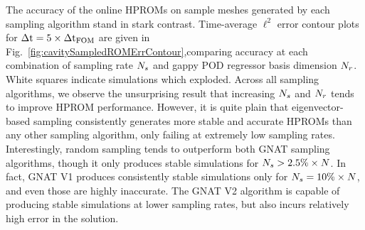 The accuracy of the online HPROMs on sample meshes generated by each sampling algorithm stand in stark contrast. Time-average $\ell^2$ error contour plots for $\Delta \text{t} = 5 \times \Delta \text{t}_{\text{FOM}}$ are given in Fig.~\ref{fig:cavitySampledROMErrContour},comparing accuracy at each combination of sampling rate $N_s$ and gappy POD regressor basis dimension $N_r$. White squares indicate simulations which exploded. Across all sampling algorithms, we observe the unsurprising result that increasing $N_s$ and $N_r$ tends to improve HPROM performance. However, it is quite plain that eigenvector-based sampling consistently generates more stable and accurate HPROMs than any other sampling algorithm, only failing at extremely low sampling rates. Interestingly, random sampling tends to outperform both GNAT sampling algorithms, though it only produces stable simulations for $N_s > 2.5\% \times N$. In fact, GNAT V1 produces consistently stable simulations only for $N_s = 10\% \times N$, and even those are highly inaccurate. The GNAT V2 algorithm is capable of producing stable simulations at lower sampling rates, but also incurs relatively high error in the solution.

